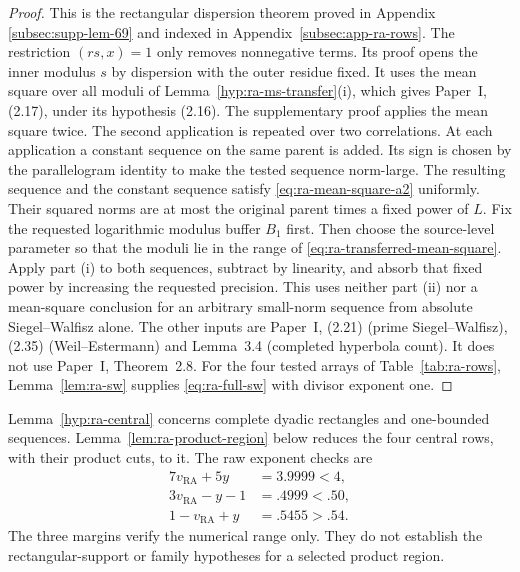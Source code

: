 \begin{proof}
This is the rectangular dispersion theorem proved in Appendix~
\hyperref[subsec:supp-lem-69]{\ref*{subsec:supp-lem-69}} and indexed
in Appendix~\hyperref[subsec:app-ra-rows]{\ref*{subsec:app-ra-rows}}.
The restriction
\((rs,x)=1\) only removes nonnegative terms. Its proof opens the inner
modulus \(s\) by dispersion with the outer residue fixed. It uses the mean
square over all moduli of Lemma~\ref{hyp:ra-ms-transfer}(i), which gives
Paper~I, (2.17), under its hypothesis (2.16). The supplementary proof applies the mean square twice.
The second application is repeated over two
correlations. At each application a constant sequence
on the same parent is added. Its sign is chosen by the parallelogram
identity to make the tested sequence norm-large. The resulting sequence
and the constant sequence satisfy \eqref{eq:ra-mean-square-a2} uniformly.
Their squared norms are at most the original parent times a fixed
power of \(L\). Fix the requested logarithmic modulus buffer \(B_1\)
first.
Then choose the source-level parameter so that the moduli lie in the
range of \eqref{eq:ra-transferred-mean-square}. Apply part (i) to both
sequences,
subtract by linearity, and absorb that fixed power by increasing the
requested precision. This uses neither part (ii) nor a mean-square
conclusion for an arbitrary small-norm sequence from absolute
Siegel--Walfisz alone. The other inputs are Paper~I, (2.21) (prime
Siegel--Walfisz), (2.35) (Weil--Estermann)
and Lemma~3.4 (completed hyperbola count). It does not use Paper~I, Theorem~2.8. For the four tested
arrays of Table~\ref{tab:ra-rows}, Lemma~\ref{lem:ra-sw} supplies
\eqref{eq:ra-full-sw} with divisor exponent one.
\end{proof}
Lemma~\ref{hyp:ra-central} concerns complete dyadic rectangles and
one-bounded sequences. Lemma~\ref{lem:ra-product-region} below reduces the
four central rows, with their product cuts, to it.
The raw exponent checks are
\begin{equation}\label{eq:ra-central-margins}
\begin{aligned}
 7v_{\mathrm{RA}}+5y&=3.9999<4,\\
 3v_{\mathrm{RA}}-y-1&=.4999<.50,\\
 1-v_{\mathrm{RA}}+y&=.5455>.54.
\end{aligned}
\end{equation}
The three margins verify the numerical range only. They do not establish
the rectangular-support or family hypotheses for a selected product region.


